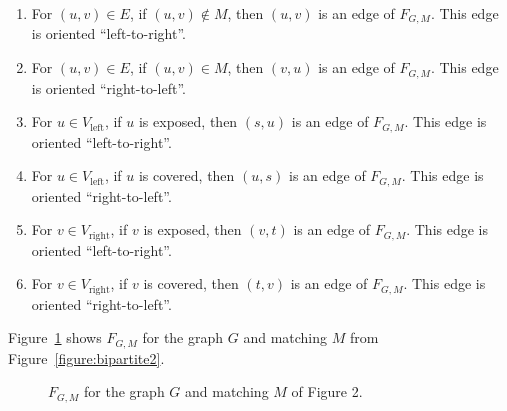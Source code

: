 \documentclass [12pt]{article}
\theoremstyle{definition}
\begin{document}
\begin{enumerate}
\item For $(u,v)\in E$, if $(u,v)\not\in M$, then $(u,v)$ is an edge of $F_{G,M}$. This edge is oriented ``left-to-right''.
\item For $(u,v)\in E$, if $(u,v)\in M$, then $(v,u)$ is an edge of $F_{G,M}$. This edge is oriented ``right-to-left''.
\item For $u\in V_{\mbox{left}}$, if $u$ is exposed, then $(s,u)$ is an edge of $F_{G,M}$. This edge is oriented ``left-to-right''.
\item For $u\in V_{\mbox{left}}$, if $u$ is covered, then $(u,s)$ is an edge of $F_{G,M}$. This edge is oriented  ``right-to-left''.
\item For $v\in V_{\mbox{right}}$, if $v$ is exposed, then $(v,t)$ is an edge of $F_{G,M}$. This edge is oriented ``left-to-right''.
\item For $v\in V_{\mbox{right}}$, if $v$ is covered, then $(t,v)$ is an edge of $F_{G,M}$. This edge is oriented  ``right-to-left''.
\end{enumerate}

Figure~\ref{figure:bipartite4} shows $F_{G,M}$ for the graph $G$ and matching $M$ from Figure~\ref{figure:bipartite2}.

\begin{figure}
\centering
{}
\caption{$F_{G,M}$ for the graph $G$ and matching $M$ of Figure 2.}
\label{figure:bipartite4}
\end{figure}
\end{document}
